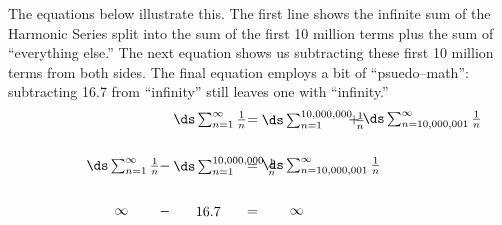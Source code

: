 The equations below illustrate this. The first line shows the infinite sum of the Harmonic Series split into the sum of the first 10 million terms plus the sum of ``everything else.'' The next equation shows us subtracting these first 10 million terms from both sides. The final equation employs a bit of ``psuedo--math'': subtracting 16.7 from ``infinity'' still leaves one with ``infinity.''
\begin{align*}
 \parbox{50pt}{\centering$\ds\sum_{n=1}^\infty \frac1n$} &= \parbox{50pt}{\centering$\ds\sum_{n=1}^{10,000,000}\frac1n$}\quad + \parbox{50pt}{\centering$\ds\sum_{n=10,000,001}^\infty \frac1n$} \rule[-20pt]{0pt}{1pt} \\
 \parbox{50pt}{\centering$\ds\sum_{n=1}^\infty \frac1n$} - \parbox{50pt}{\centering$\ds\sum_{n=1}^{10,000,000}\frac1n$}&= \parbox{50pt}{\centering$\ds\sum_{n=10,000,001}^\infty \frac1n$} \rule[-20pt]{0pt}{1pt}\\
\parbox{50pt}{\centering	$\infty$} - \parbox{50pt}{\centering $16.7$} &=  \parbox{50pt}{\centering$\infty$}
\end{align*}													


